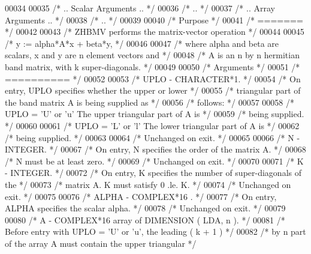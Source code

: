 \begin{DoxyCode}
00034 
00035 \textcolor{comment}{/*     .. Scalar Arguments .. */}
00036 \textcolor{comment}{/*     .. */}
00037 \textcolor{comment}{/*     .. Array Arguments .. */}
00038 \textcolor{comment}{/*     .. */}
00039 
00040 \textcolor{comment}{/*  Purpose */}
00041 \textcolor{comment}{/*  ======= */}
00042 
00043 \textcolor{comment}{/*  ZHBMV  performs the matrix-vector  operation */}
00044 
00045 \textcolor{comment}{/*     y := alpha*A*x + beta*y, */}
00046 
00047 \textcolor{comment}{/*  where alpha and beta are scalars, x and y are n element vectors and */}
00048 \textcolor{comment}{/*  A is an n by n hermitian band matrix, with k super-diagonals. */}
00049 
00050 \textcolor{comment}{/*  Arguments */}
00051 \textcolor{comment}{/*  ========== */}
00052 
00053 \textcolor{comment}{/*  UPLO   - CHARACTER*1. */}
00054 \textcolor{comment}{/*           On entry, UPLO specifies whether the upper or lower */}
00055 \textcolor{comment}{/*           triangular part of the band matrix A is being supplied as */}
00056 \textcolor{comment}{/*           follows: */}
00057 
00058 \textcolor{comment}{/*              UPLO = 'U' or 'u'   The upper triangular part of A is */}
00059 \textcolor{comment}{/*                                  being supplied. */}
00060 
00061 \textcolor{comment}{/*              UPLO = 'L' or 'l'   The lower triangular part of A is */}
00062 \textcolor{comment}{/*                                  being supplied. */}
00063 
00064 \textcolor{comment}{/*           Unchanged on exit. */}
00065 
00066 \textcolor{comment}{/*  N      - INTEGER. */}
00067 \textcolor{comment}{/*           On entry, N specifies the order of the matrix A. */}
00068 \textcolor{comment}{/*           N must be at least zero. */}
00069 \textcolor{comment}{/*           Unchanged on exit. */}
00070 
00071 \textcolor{comment}{/*  K      - INTEGER. */}
00072 \textcolor{comment}{/*           On entry, K specifies the number of super-diagonals of the */}
00073 \textcolor{comment}{/*           matrix A. K must satisfy  0 .le. K. */}
00074 \textcolor{comment}{/*           Unchanged on exit. */}
00075 
00076 \textcolor{comment}{/*  ALPHA  - COMPLEX*16      . */}
00077 \textcolor{comment}{/*           On entry, ALPHA specifies the scalar alpha. */}
00078 \textcolor{comment}{/*           Unchanged on exit. */}
00079 
00080 \textcolor{comment}{/*  A      - COMPLEX*16       array of DIMENSION ( LDA, n ). */}
00081 \textcolor{comment}{/*           Before entry with UPLO = 'U' or 'u', the leading ( k + 1 ) */}
00082 \textcolor{comment}{/*           by n part of the array A must contain the upper triangular */}

\end{DoxyCode}
